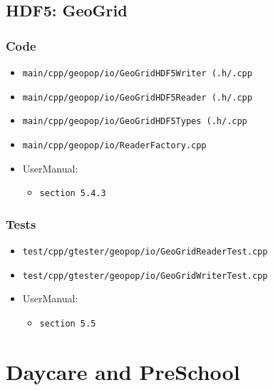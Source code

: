 \documentclass[runningheads]{llncs}
\begin{document}
	\subsection{HDF5: GeoGrid}
	\subsubsection{Code}
	\begin{itemize}
		\item \texttt{main/cpp/geopop/io/GeoGridHDF5Writer (.h/.cpp}
		\item \texttt{main/cpp/geopop/io/GeoGridHDF5Reader (.h/.cpp}
		\item \texttt{main/cpp/geopop/io/GeoGridHDF5Types (.h/.cpp}
		\item \texttt{main/cpp/geopop/io/ReaderFactory.cpp}
		\item UserManual:		
		\begin{itemize}
			\item \texttt{section 5.4.3}
		\end{itemize}
	\end{itemize}
	
	\subsubsection{Tests}
	\begin{itemize}
		\item \texttt{test/cpp/gtester/geopop/io/GeoGridReaderTest.cpp} 
		\item \texttt{test/cpp/gtester/geopop/io/GeoGridWriterTest.cpp} 
		\item UserManual:
		\begin{itemize}
			\item \texttt{section 5.5}
		\end{itemize}
	\end{itemize}
	\section{Daycare and PreSchool}
\end{document}
